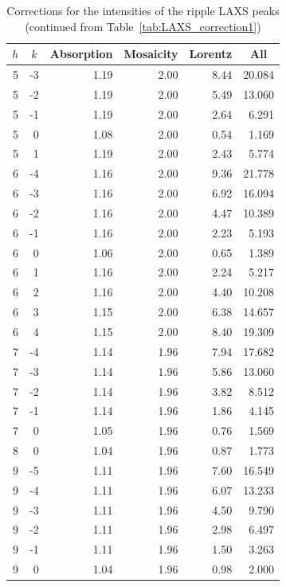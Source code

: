 \begin{table}[htbp]
  \centering
    \begin{tabular}{rrrrrr}
    \hline
    \multicolumn{1}{c}{$h$} & \multicolumn{1}{c}{$k$} & \multicolumn{1}{c}{Absorption} & \multicolumn{1}{c}{Mosaicity} & \multicolumn{1}{c}{Lorentz} & \multicolumn{1}{c}{All}\\
    \hline        
    5  & -3 & 1.19 & 2.00 & 8.44 & 20.084 \\
    5  & -2 & 1.19 & 2.00 & 5.49 & 13.060 \\
    5  & -1 & 1.19 & 2.00 & 2.64 & 6.291  \\
    5  & 0  & 1.08 & 2.00 & 0.54 & 1.169  \\
    5  & 1  & 1.19 & 2.00 & 2.43 & 5.774  \\
    6  & -4 & 1.16 & 2.00 & 9.36 & 21.778 \\
    6  & -3 & 1.16 & 2.00 & 6.92 & 16.094 \\
    6  & -2 & 1.16 & 2.00 & 4.47 & 10.389 \\
    6  & -1 & 1.16 & 2.00 & 2.23 & 5.193  \\
    6  & 0  & 1.06 & 2.00 & 0.65 & 1.389  \\
    6  & 1  & 1.16 & 2.00 & 2.24 & 5.217  \\
    6  & 2  & 1.16 & 2.00 & 4.40 & 10.208 \\
    6  & 3  & 1.15 & 2.00 & 6.38 & 14.657 \\
    6  & 4  & 1.15 & 2.00 & 8.40 & 19.309 \\
    7  & -4 & 1.14 & 1.96 & 7.94 & 17.682 \\
    7  & -3 & 1.14 & 1.96 & 5.86 & 13.060 \\
    7  & -2 & 1.14 & 1.96 & 3.82 & 8.512  \\
    7  & -1 & 1.14 & 1.96 & 1.86 & 4.145  \\
    7  & 0  & 1.05 & 1.96 & 0.76 & 1.569  \\
    8  & 0  & 1.04 & 1.96 & 0.87 & 1.773  \\
    9  & -5 & 1.11 & 1.96 & 7.60 & 16.549 \\
    9  & -4 & 1.11 & 1.96 & 6.07 & 13.233 \\
    9  & -3 & 1.11 & 1.96 & 4.50 & 9.790  \\
    9  & -2 & 1.11 & 1.96 & 2.98 & 6.497  \\
    9  & -1 & 1.11 & 1.96 & 1.50 & 3.263  \\
    9  & 0  & 1.04 & 1.96 & 0.98 & 2.000  \\
    \hline
    \end{tabular}%
  \caption{Corrections for the intensities of the ripple LAXS peaks 
  (continued from Table~\ref{tab:LAXS_correction1})}
  \label{tab:LAXS_correction2}%
\end{table}%

